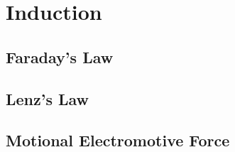 \section{Induction}

\subsection{Faraday's Law}

\subsection{Lenz's Law}

\subsection{Motional Electromotive Force}
